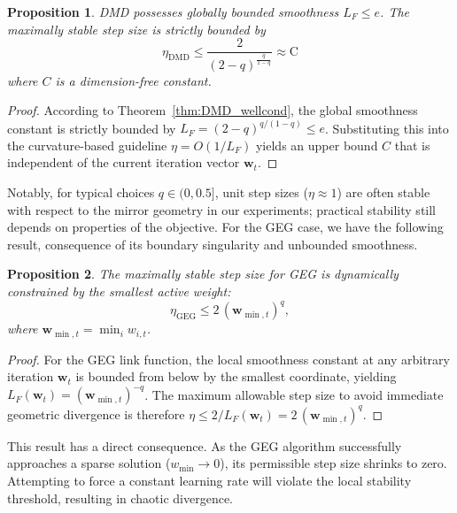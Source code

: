 \documentclass[10pt]{amsart}
\newcommand{\bw}{\boldsymbol{w}}
\newtheorem{proposition}{Proposition}
\theoremstyle{definition}
\theoremstyle{definition}	 %
\begin{document}
\begin{proposition}%
\label{prop:DMD_stepsize}
DMD possesses globally bounded smoothness $L_F \le e$. The maximally stable step size is strictly bounded by 
\begin{equation}
    \eta_{\mathrm{DMD}} \le \frac{2}{(2-q)^{\frac{q}{1-q}}} \approx \text{C}
    \end{equation}
where $C$ is a dimension-free constant.


\end{proposition}
\begin{proof}
According to Theorem~\ref{thm:DMD_wellcond}, the global smoothness constant is strictly bounded by $L_F = (2-q)^{q/(1-q)} \le e$. Substituting this into the curvature-based guideline $\eta = O(1/L_F)$ yields an upper bound $C$ that is  independent of the current iteration vector $\bw_t$. 
\end{proof}
Notably, for typical choices $q \in (0, 0.5]$, unit step sizes ($\eta\approx 1$) are often stable with respect to the mirror geometry in our experiments; practical stability still depends on properties of the objective.
For the GEG  case, we have the following result, consequence of its boundary singularity and unbounded smoothness.
\begin{proposition}%
\label{prop:GEG_stepsize}
The maximally stable step size for GEG is dynamically constrained by the smallest active weight:
\begin{equation}
    \eta_{\mathrm{GEG}} \le 2 \, (\bw_{\min,t})^q,
\end{equation}
where $\bw_{\min,t} = \min_i w_{i,t}$.
\end{proposition}
\begin{proof}
For the GEG link function, the local smoothness constant at any arbitrary iteration $\bw_t$ is bounded from below by the smallest coordinate, yielding $L_F(\bw_t) = (\bw_{\min,t})^{-q}$. The maximum allowable step size to avoid immediate geometric divergence is therefore $\eta \le 2/L_F(\bw_t) = 2\,(\bw_{\min,t})^q$.
\end{proof}

This result has a direct consequence. As the GEG algorithm successfully approaches a sparse solution ($w_{\min} \to 0$), its permissible step size shrinks to zero. Attempting to force a constant learning rate will violate the local stability threshold, resulting in chaotic divergence.
\end{document}

